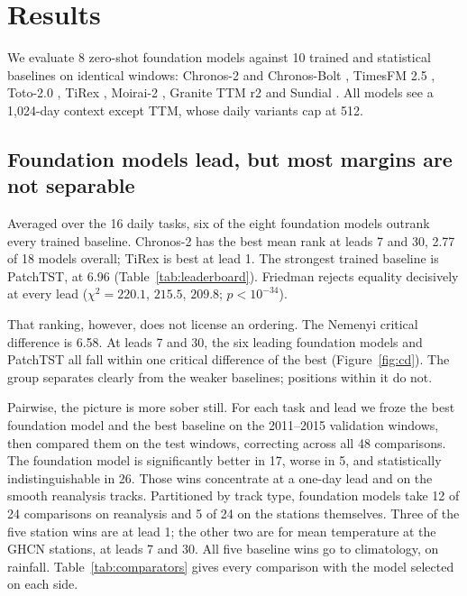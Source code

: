 \section{Results}
\label{sec:results}

We evaluate 8 zero-shot foundation models against 10 trained and statistical baselines on identical windows:
Chronos-2 \citep{ansari2026chronos2} and Chronos-Bolt \citep{ansari2024chronos}, TimesFM 2.5
\citep{das2024timesfm}, Toto-2.0 \citep{cohen2025toto}, TiRex \citep{auer2025tirex}, Moirai-2
\citep{liu2026moirai2,woo2024moirai}, Granite TTM r2 \citep{ekambaram2024ttm} and Sundial
\citep{liu2025sundial}. All models see a
1{,}024-day context except TTM, whose daily variants cap at 512.

\subsection{Foundation models lead, but most margins are not separable}

Averaged over the 16 daily tasks, six of the eight foundation models outrank every trained baseline. Chronos-2 has
the best mean rank at leads 7 and 30, 2.77 of 18 models overall; TiRex is best at lead 1. The strongest trained
baseline is PatchTST, at 6.96 (Table~\ref{tab:leaderboard}). Friedman rejects equality decisively at every lead
($\chi^2 = 220.1$, $215.5$, $209.8$; $p < 10^{-34}$).

That ranking, however, does not license an ordering. The Nemenyi critical difference is 6.58. At leads 7 and 30, the six
leading foundation models and PatchTST all fall within one critical difference of the best
(Figure~\ref{fig:cd}). The group separates clearly from the weaker baselines; positions within it do not.

Pairwise, the picture is more sober still. For each task and lead we froze the best foundation model and the best
baseline on the 2011--2015 validation windows, then compared them on the test windows, correcting across all 48
comparisons. The foundation model is significantly better in 17, worse in 5, and statistically indistinguishable
in 26. Those wins concentrate at a one-day lead and on the smooth reanalysis tracks. Partitioned by track type,
foundation models take 12 of 24 comparisons on reanalysis and 5 of 24 on the stations themselves. Three of the
five station wins are at lead 1; the other two are for mean temperature at the GHCN stations, at leads 7 and 30.
All five baseline wins go to climatology, on rainfall. Table~\ref{tab:comparators} gives every comparison with the
model selected on each side.


